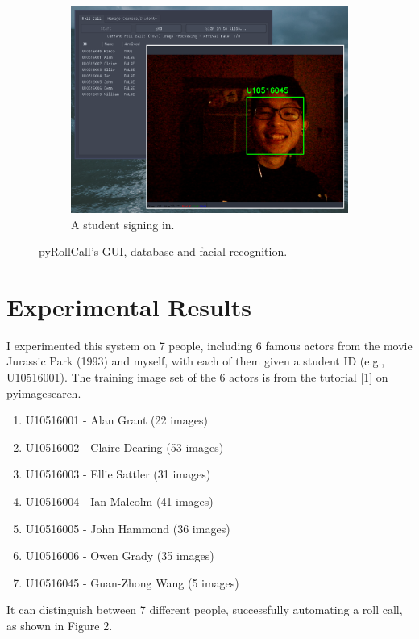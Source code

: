 \documentclass[14pt]{report}
\begin{document}
\begin{figure}[b!]
\begin{subfigure}[b]{0.32\linewidth}
            \includegraphics[width=\linewidth]{preview3.eps}
            \caption{A student signing in.}
        \end{subfigure}
        \caption{pyRollCall's GUI, database and facial recognition.}
        \label{fig:implementation}
\end{figure}


\section{Experimental Results}
I experimented this system on 7 people, including 6 famous actors from the movie Jurassic Park (1993) and
myself, with each of them given a student ID (e.g., U10516001). The training image set of the 6 actors is
from the tutorial [1] on pyimagesearch.
\newline

\begin{enumerate}
    \item U10516001 - Alan Grant (22 images)
    \item U10516002 - Claire Dearing (53 images)
    \item U10516003 - Ellie Sattler (31 images)
    \item U10516004 - Ian Malcolm (41 images)
    \item U10516005 - John Hammond (36 images)
    \item U10516006 - Owen Grady (35 images)
    \item U10516045 - Guan-Zhong Wang (5 images)
\end{enumerate}

It can distinguish between 7 different people, successfully automating a roll call, as shown in Figure 2.
\end{document}
